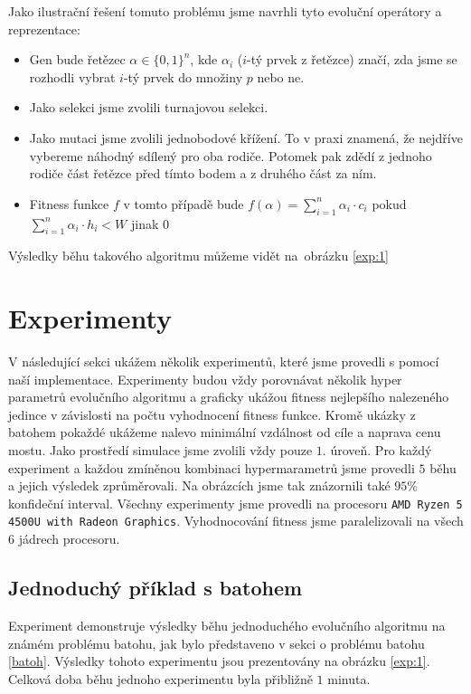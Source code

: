 Jako ilustrační řešení tomuto problému jsme navrhli tyto evoluční operátory a reprezentace:
\begin{itemize}
    \item Gen bude řetězec $\alpha \in \{0,1\}^n$, kde $\alpha_i$ ($i$-tý prvek z řetězce) značí, zda jsme se rozhodli vybrat $i$-tý prvek do množiny $p$ nebo ne.
    \item Jako selekci jsme zvolili turnajovou selekci.
    \item Jako mutaci jsme zvolili jednobodové křížení. To v praxi znamená, že nejdříve vybereme náhodný sdílený pro oba rodiče. Potomek pak zdědí z jednoho rodiče část řetězce před tímto bodem a z druhého část za ním. 
    \item Fitness funkce $f$ v tomto případě bude $f(\alpha) = \sum_{i=1}^n \alpha_i \cdot c_i$ pokud $\sum_{i=1}^n \alpha_i \cdot h_i < W$ jinak $0$
\end{itemize}

Výsledky běhu takového algoritmu můžeme vidět na~obrázku \ref{exp:1}

\chapter{Experimenty}

V následující sekci ukážem několik experimentů, které jsme provedli s pomocí naší implementace. Experimenty budou vždy porovnávat několik hyper parametrů evolučního algoritmu a graficky ukážou fitness nejlepšího nalezeného jedince v závislosti na počtu vyhodnocení fitness funkce. Kromě ukázky z batohem pokaždé ukážeme nalevo minimální vzdálnost od cíle a naprava cenu mostu. Jako prostředí simulace jsme zvolili vždy pouze $1.$ úroveň. Pro každý experiment a každou zmíněnou kombinaci hypermarametrů jsme provedli $5$ běhu a jejich výsledek zprůměrovali. Na obrázcích jsme tak znázornili také $95\%$ konfideční interval. Všechny experimenty jsme provedli na procesoru \texttt{AMD Ryzen 5 4500U with Radeon Graphics}. Vyhodnocování fitness jsme paralelizovali na všech $6$ jádrech procesoru.

\section{Jednoduchý příklad s batohem}

Experiment demonstruje výsledky běhu jednoduchého evolučního algoritmu na známém problému batohu, jak bylo představeno v sekci o problému batohu \ref{batoh}. Výsledky tohoto experimentu jsou prezentovány na obrázku \ref{exp:1}. Celková doba běhu jednoho experimentu byla přibližně $1$ minuta.

